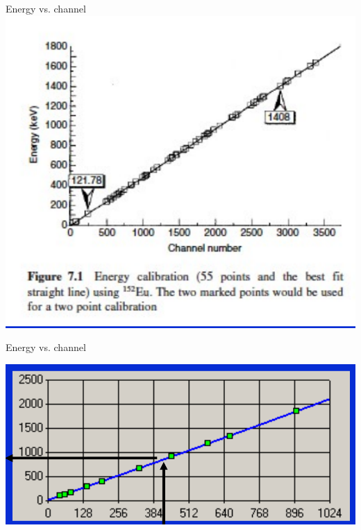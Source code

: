 \begin{frame}{Energy vs. channel}
\includegraphics[scale=0.4]{figures/energy_channel.png}
\end{frame}

\begin{frame}{Energy vs. channel}

\centering
\includegraphics[scale=0.3]{figures/laruc_energy_channel.png}

\end{frame}

